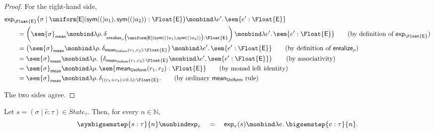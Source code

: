 \begin{proof}
For the right-hand side,
\begin{align}
  &\mathsf{exp}_{\Float{\E}}
  \bigl(
    \sigma
    \mid
    \uniform[\E](\sym(a_1),\sym(a_2)):\Float{\E}
  \bigr)
  \monbind
  \lambda e'.\,\sem{e':\Float{\E}}
  \notag
  \\
  &\qquad=
  \left(
    \sem{\sigma}_{\mathsf{mean}}
    \monbind
    \lambda\rho.\,
    \delta_{
      \mathsf{erealize}_\rho
      \bigl(
        \uniform[\E](\sym(a_1),\sym(a_2))
      \bigr)
      :\Float{\E}
    }
  \right)
  \monbind
  \lambda e'.\,\sem{e':\Float{\E}}
  \tag{\text{by definition of $\mathsf{exp}_{\Float{\E}}$}}
  \\
  &\qquad=
  \left(
    \sem{\sigma}_{\mathsf{mean}}
    \monbind
    \lambda\rho.\,
    \delta_{
      \mathsf{mean}_{\mathsf{Uniform}}(r_1,r_2)
      :\Float{\E}
    }
  \right)
  \monbind
  \lambda e'.\,\sem{e':\Float{\E}}
  \tag{\text{by definition of $\mathsf{erealize}_\rho$}}
  \\
  &\qquad=
  \sem{\sigma}_{\mathsf{mean}}
  \monbind
  \lambda\rho.\,
  \left(
    \delta_{
      \mathsf{mean}_{\mathsf{Uniform}}(r_1,r_2)
      :\Float{\E}
    }
    \monbind
    \lambda e'.\,\sem{e':\Float{\E}}
  \right)
  \tag{\text{by associativity}}
  \\
  &\qquad=
  \sem{\sigma}_{\mathsf{mean}}
  \monbind
  \lambda\rho.\,
  \sem{
    \mathsf{mean}_{\mathsf{Uniform}}(r_1,r_2)
    :\Float{\E}
  }
  \tag{\text{by monad left identity}}
  \\
  &\qquad=
  \sem{\sigma}_{\mathsf{mean}}
  \monbind
  \lambda\rho.\,
  \delta_{
    ((r_1+r_2)\times 0.5)
    :\Float{\E}
  }.
  \tag{\text{by ordinary $\mathsf{mean}_{\mathsf{Uniform}}$ rule}}
\end{align}

The two sides agree.
\end{proof}


\begin{theorem}
  \label{thm:expected-symbolic-n-step}
  Let
  $s=(\sigma\mid\hat e:\tau)\in State_\tau$.
  Then, for every $n\in\mathbb N$,
  \[
    \symbigsemstep{s:\tau}{n}
    \monbind
    \mathsf{exp}_\tau
    \quad 
    = 
    \quad
    \mathsf{exp}_\tau(s)
    \monbind
    \lambda e.\,
    \bigsemstep{e:\tau}{n}.
  \]
\end{theorem}

